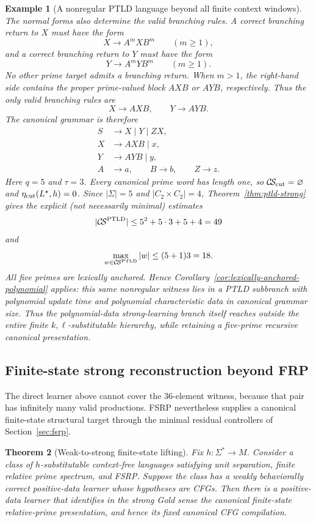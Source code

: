 \documentclass[11pt,a4paper]{article}
\newtheorem{theorem}{Theorem}[section]
\newtheorem{example}[theorem]{Example}
\newcommand{\CS}{\mathcal{C}\!\mathcal{S}}
\begin{document}
\begin{example}[A nonregular PTLD language beyond all finite context windows]
The normal forms also determine the valid branching rules.  A correct branching return to $X$ must have the form
\[
X\to A^mXB^m\qquad(m\ge1),
\]
and a correct branching return to $Y$ must have the form
\[
Y\to A^mYB^m\qquad(m\ge1).
\]
No other prime target admits a branching return.  When $m>1$, the right-hand side contains the proper prime-valued block $AXB$ or $AYB$, respectively.  Thus the only valid branching rules are
\[
X\to AXB,
\qquad
Y\to AYB.
\]
The canonical grammar is therefore
\[
\begin{aligned}
S&\to X\mid Y\mid ZX,\\
X&\to AXB\mid x,\\
Y&\to AYB\mid y,\\
A&\to a,\qquad B\to b,\qquad Z\to z.
\end{aligned}
\]
Here $q=5$ and $\tau=3$.  Every canonical prime word has length one, so $\CS_{\rm cut}=\varnothing$ and $\eta_{\rm cut}(L^\star,h)=0$.  Since $|\Sigma|=5$ and $|C_2\times C_2|=4$, Theorem~\ref{thm:ptld-strong} gives the explicit (not necessarily minimal) estimates
\[
|\CS^{\rm PTLD}|\le 5^2+5\cdot3+5+4=49
\]
and
\[
\max_{w\in\CS^{\rm PTLD}}|w|\le(5+1)3=18.
\]
All five primes are lexically anchored.  Hence
Corollary~\ref{cor:lexically-anchored-polynomial} applies: this same
nonregular witness lies in a PTLD subbranch with polynomial update time and
polynomial characteristic data in canonical grammar size.  Thus the
polynomial-data strong-learning branch itself reaches outside the entire
finite $k,\ell$-substitutable hierarchy, while retaining a five-prime
recursive canonical presentation.
\end{example}

\subsection{Finite-state strong reconstruction beyond FRP}

The direct learner above cannot cover the $36$-element witness, because that pair has infinitely many valid productions.  FSRP nevertheless supplies a canonical finite-state structural target through the minimal residual controllers of Section~\ref{sec:fsrp}.

\begin{theorem}[Weak-to-strong finite-state lifting]
\label{thm:fsrp-strong}
Fix $h:\Sigma^*\to M$.  Consider a class of $h$-substitutable context-free languages satisfying unit separation, finite relative prime spectrum, and FSRP.  Suppose the class has a weakly behaviorally correct positive-data learner whose hypotheses are CFGs.  Then there is a positive-data learner that identifies in the strong Gold sense the canonical finite-state relative-prime presentation, and hence its fixed canonical CFG compilation.
\end{theorem}
\end{document}
